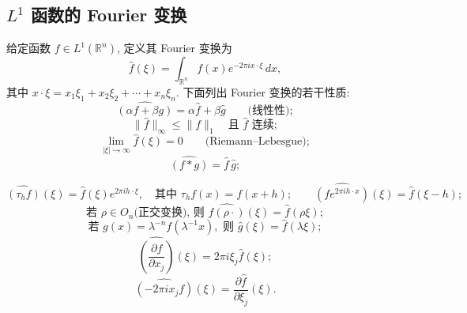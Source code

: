 \subsection{$L^1$ 函数的 Fourier 变换}
\label{sec:ch1-fourier-transform-l1}

给定函数 $f\in L^1(\mathbb R^n)$, 定义其 Fourier 变换为
\begin{equation}
\label{eq:ch1-fourier-transform-definition}
 \widehat f(\xi)=\int_{\mathbb R^n}f(x)e^{-2\pi ix\cdot\xi}\,dx,
\end{equation}
其中 $x\cdot\xi=x_1\xi_1+x_2\xi_2+\cdots+x_n\xi_n$. 下面列出 Fourier 变换的若干性质:
\begin{equation}
\label{eq:ch1-fourier-linearity}
 \widehat{(\alpha f+\beta g)}=\alpha\widehat f+\beta\widehat g
 \qquad\text{(线性性)};
\end{equation}
\begin{equation}
\label{eq:ch1-fourier-l1-linfty}
 \|\widehat f\|_\infty\le\|f\|_1
 \quad\text{且 }\widehat f\text{ 连续};
\end{equation}
\begin{equation}
\label{eq:ch1-fourier-riemann-lebesgue}
 \lim_{|\xi|\to\infty}\widehat f(\xi)=0
 \qquad\text{(Riemann--Lebesgue)};
\end{equation}
\begin{equation}
\label{eq:ch1-fourier-convolution}
 \widehat{(f*g)}=\widehat f\,\widehat g;
\end{equation}

\hypertarget{chapter-01-page-024}{}
\begin{equation}
\label{eq:ch1-fourier-translation-modulation}
 \widehat{(\tau_hf)}(\xi)=\widehat f(\xi)e^{2\pi ih\cdot\xi},
 \quad\text{其中 }\tau_hf(x)=f(x+h);
 \qquad
 \widehat{(fe^{2\pi ih\cdot x})}(\xi)=\widehat f(\xi-h);
\end{equation}
\begin{equation}
\label{eq:ch1-fourier-orthogonal-transform}
 \text{若 }\rho\in O_n\text{(正交变换), 则 }
 \widehat{f(\rho\cdot)}(\xi)=\widehat f(\rho\xi);
\end{equation}
\begin{equation}
\label{eq:ch1-fourier-dilation}
 \text{若 }g(x)=\lambda^{-n}f(\lambda^{-1}x),
 \text{ 则 }\widehat g(\xi)=\widehat f(\lambda\xi);
\end{equation}
\begin{equation}
\label{eq:ch1-fourier-derivative}
 \widehat{\left(\frac{\partial f}{\partial x_j}\right)}(\xi)
 =2\pi i\xi_j\widehat f(\xi);
\end{equation}
\begin{equation}
\label{eq:ch1-fourier-coordinate-multiplication}
 \widehat{(-2\pi ix_jf)}(\xi)=\frac{\partial\widehat f}{\partial\xi_j}(\xi).
\end{equation}

